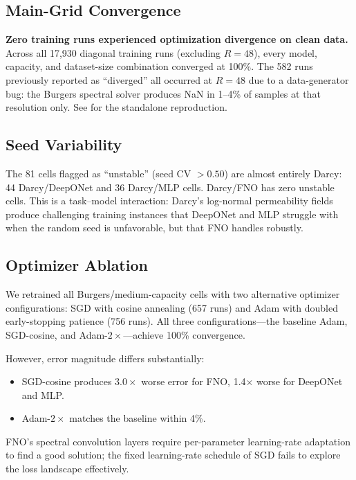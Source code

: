 \documentclass[11pt]{article}
\newcommand{\nDiagTraining}{17{,}930}
\newcommand{\regUnstable}{81}
\newcommand{\sgdFnoRatio}{3.0}
\begin{document}
\subsection{Main-Grid Convergence}

\textbf{Zero training runs experienced optimization divergence on
clean data.} Across all \nDiagTraining{} diagonal training runs
(excluding $R{=}48$), every model, capacity, and dataset-size
combination converged at 100\%. The 582 runs previously reported as
``diverged'' all occurred at $R{=}48$ due to a data-generator bug:
the Burgers spectral solver produces NaN in 1--4\% of samples at
that resolution only. See  for the standalone
reproduction.

\subsection{Seed Variability}

The \regUnstable{} cells flagged as ``unstable'' (seed CV $> 0.50$)
are almost entirely Darcy: 44 Darcy/DeepONet and 36 Darcy/MLP cells.
Darcy/FNO has zero unstable cells. This is a task--model interaction:
Darcy's log-normal permeability fields produce challenging training
instances that DeepONet and MLP struggle with when the random seed is
unfavorable, but that FNO handles robustly.

\subsection{Optimizer Ablation}

We retrained all Burgers/medium-capacity cells with two alternative
optimizer configurations: SGD with cosine annealing (657 runs) and
Adam with doubled early-stopping patience (756 runs). All three
configurations---the baseline Adam, SGD-cosine, and
Adam-$2\times$---achieve 100\% convergence.

However, error magnitude differs substantially:
\begin{itemize}[nosep]
  \item SGD-cosine produces $\sgdFnoRatio{\times}$ worse error for
    FNO, 1.4$\times$ worse for DeepONet and MLP.
  \item Adam-$2\times$ matches the baseline within 4\%.
\end{itemize}
FNO's spectral convolution layers require per-parameter learning-rate
adaptation to find a good solution; the fixed learning-rate schedule
of SGD fails to explore the loss landscape effectively.
\end{document}
